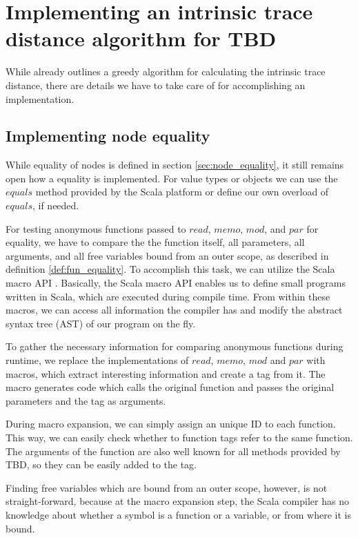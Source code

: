 \section{Implementing an intrinsic trace distance algorithm for TBD}
While \cite{Acar2005thesis} already outlines a greedy algorithm for calculating the intrinsic trace distance, there are details we have to take care of for accomplishing an implementation.

\subsection{Implementing node equality}
While equality of nodes is defined in section \ref{sec:node_equality}, it still remains open how a equality is implemented. For value types or objects we can use the $equals$ method provided by the Scala platform or define our own overload of $equals$, if needed.  

For testing anonymous functions passed to $read$, $memo$, $mod$, and $par$ for equality, we have to compare the the function itself, all parameters, all arguments, and all free variables bound from an outer scope, as described in definition \ref{def:fun_equality}. To accomplish this task, we can utilize the Scala macro API \cite{burmako2013scala}. Basically, the Scala macro API enables us to define small programs written in Scala, which are executed during compile time. From within these macros, we can access all information the compiler has and modify the abstract syntax tree (AST) of our program on the fly. 

To gather the necessary information for comparing anonymous functions during runtime, we replace the implementations of $read$, $memo$, $mod$ and $par$ with macros, which extract interesting information and create a tag from it. The macro generates code which calls the original function and passes the original parameters and the tag as arguments. 

During macro expansion, we can simply assign an unique ID to each function. This way, we can easily check whether to function tags refer to the same function. The arguments of the function are also well known for all methods provided by TBD, so they can be easily added to the tag. 

Finding free variables which are bound from an outer scope, however, is not straight-forward, because at the macro expansion step, the Scala compiler has no knowledge about whether a symbol is a function or a variable, or from where it is bound.

